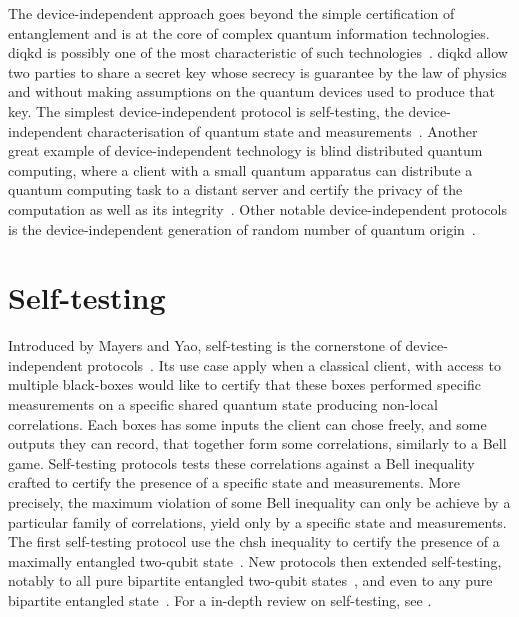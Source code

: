 \medbreak

The device-independent approach goes beyond the simple certification of entanglement and is at the core of complex quantum information technologies.
\acrfull{diqkd} is possibly one of the most characteristic of such technologies~\cite{Pironio2009,Nadlinger2022}.
\acrshort{diqkd} allow two parties to share a secret key whose secrecy is guarantee by the law of physics and without making assumptions on the quantum devices used to produce that key.
The simplest device-independent protocol is self-testing, the device-independent characterisation of quantum state and measurements~\cite{Supic2019}.
Another great example of device-independent technology is blind distributed quantum computing, where a client with a small quantum apparatus can distribute a quantum computing task to a distant server and certify the privacy of the computation as well as its integrity~\cite{Fitzsimons2017}.
Other notable device-independent protocols is the device-independent generation of random number of quantum origin~\cite{Liu2018}.

\section{Self-testing}

Introduced by Mayers and Yao, self-testing is the cornerstone of device-independent protocols~\cite{Mayers2004}.
Its use case apply when a classical client, with access to multiple black-boxes would like to certify that these boxes performed specific measurements on a specific shared quantum state producing non-local correlations.
Each boxes has some inputs the client can chose freely, and some outputs they can record, that together form some correlations, similarly to a Bell game.
Self-testing protocols tests these correlations against a Bell inequality crafted to certify the presence of a specific state and measurements.
More precisely, the maximum violation of some Bell inequality can only be achieve by a particular family of correlations, yield only by a specific state and measurements.
The first self-testing protocol use the \acrshort{chsh} inequality to certify the presence of a maximally entangled two-qubit state~\cite{Mayers2004}. 
New protocols then extended self-testing, notably to all pure bipartite entangled two-qubit states~\cite{Yang2013,Bamps2015}, and even to any pure bipartite entangled state~\cite{Coladangelo2017}. 
For a in-depth review on self-testing, see \cite{Supic2019}.

\medbreak

